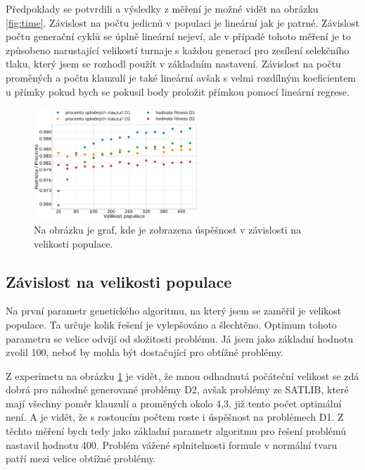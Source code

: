 \documentclass[11pt]{article}
\begin{document}
Předpoklady se potvrdili a výsledky z měření je možné vidět na obrázku \ref{fig:time}. Závislost na počtu jedicnů v populaci je lineární jak je patrné. Závislost počtu generační cyklů se úplně lineární nejeví, ale v případě tohoto měření je to způsobeno narustající velikostí turnaje s každou generací pro zesílení selekčního tlaku, který jsem se rozhodl použít v základním nastavení. Závislost na počtu proměných a počtu klauzulí je také lineární avšak s velmi rozdílným koeficientem u přímky pokud bych se pokusil body proložit přímkou pomocí lineární regrese.


\begin{figure}
\begin{center}
\includegraphics[width=0.55\textwidth]{img/sat_gen_size.pdf} 
\caption{Na obrázku je graf, kde je zobrazena úspěšnost v závislosti na velikosti populace.}
\label{fig:genSize}
\end{center}
\end{figure}

\subsection{Závislost na velikosti populace}
Na první parametr genetického algoritmu, na který jsem se zaměřil je velikost populace. Ta určuje kolik řešení je vylepšováno a šlechtěno. Optimum tohoto parametru se velice odvíjí od složitosti problému. Já jsem jako základní hodnotu zvolil 100, neboť by mohla být dostačující pro obtížné problémy.

Z experimetu na obrázku \ref{fig:genSize} je vidět, že mnou odhadnutá počáteční velikost se zdá dobrá pro náhodně generované problémy D2, avšak problémy ze SATLIB, které mají všechny poměr klauzulí a proměných okolo 4,3, již tento počet optimální není. A je vidět, že s rostoucím počtem roste i úspěšnost na problémech D1. Z těchto měření bych tedy jako základní parametr algoritmu pro řešení problémů nastavil hodnotu 400. Problém vážené splnitelnosti formule v normální tvaru patří mezi velice obtížné problémy.
\end{document}
